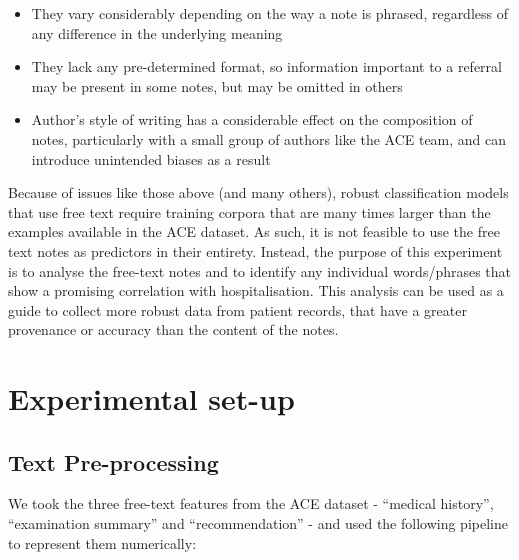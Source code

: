    \begin{itemize}
       \item They vary considerably depending on the way a note is phrased, regardless of any difference in the underlying meaning
       \item They lack any pre-determined format, so information important to a referral may be present in some notes, but may be omitted in others
       \item Author's style of writing has a considerable effect on the composition of notes, particularly with a small group of authors like the ACE team, and can introduce unintended biases as a result
   \end{itemize}

   Because of issues like those above (and many others), robust classification models that use free text require training corpora that are many times larger than the examples available in the ACE dataset. As such, it is not feasible to use the free text notes as predictors in their entirety. Instead, the purpose of this experiment is to analyse the free-text notes and to identify any individual words/phrases that show a promising correlation with hospitalisation. This analysis can be used as a guide to collect more robust data from patient records, that have a greater provenance or accuracy than the content of the notes.


   \section{Experimental set-up}\label{sec:experimental-set-up2}

   \subsection{Text Pre-processing}\label{subsec:text-pre-processing}

   We took the three free-text features from the ACE dataset - ``medical history'', ``examination summary'' and ``recommendation'' - and used the following pipeline to represent them numerically:

